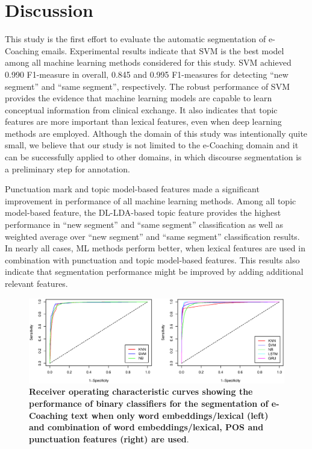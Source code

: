 \documentclass{amia}
\begin{document}
\section*{Discussion}
This study is the first effort to evaluate the automatic segmentation of e-Coaching emails. Experimental results indicate that SVM is the best model among all machine learning methods considered for this study. SVM achieved 0.990 F1-measure in overall, 0.845 and 0.995 F1-measures for detecting ``new segment'' and ``same segment'', respectively. The robust performance of SVM provides the evidence that machine learning models are capable to learn conceptual information from clinical exchange. It also indicates that topic features are more important than lexical features, even when deep learning methods are employed. Although the domain of this study was intentionally quite small, we believe that our study is not limited to the e-Coaching domain and it can be successfully applied to other domains, in which discourse segmentation is a preliminary step for annotation.

Punctuation mark and topic model-based features made a significant improvement in performance of all machine learning methods. Among all topic model-based feature, the DL-LDA-based topic feature provides the highest performance in ``new segment'' and ``same segment'' classification as well as weighted average over ``new segment'' and ``same segment'' classification results. In nearly all cases, ML methods perform better, when lexical features are used in combination with punctuation and topic model-based features. This results also indicate that segmentation performance might be improved by adding additional relevant features. \\      

\begin{figure}[!htb]
    \centering
    \includegraphics[width=1.0\textwidth]{figures/roc-curves.eps}
    \caption{\textbf{Receiver operating characteristic curves showing the performance of binary classifiers for the segmentation of e-Coaching text when only word embeddings/lexical (left) and combination of word embeddings/lexical, POS and punctuation features (right) are used}.}
    \label{fig:roc-curves}
\end{figure}
\end{document}

